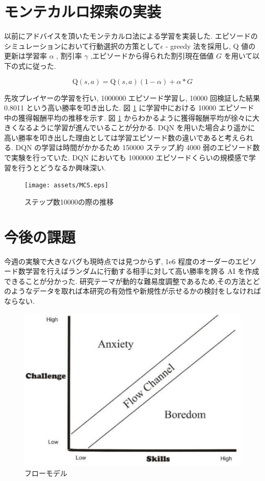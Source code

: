 \documentclass{jarticle}     %
\begin{document}
\section{モンテカルロ探索の実装}
以前にアドバイスを頂いたモンテカルロ法による学習を実装した\cite{緑本}.
エピソードのシミュレーションにおいて行動選択の方策として$\epsilon$ - greedy 法を採用し,
Q 値の更新は学習率 $\alpha$ , 割引率 $\gamma$ ,エピソードから得られた割引現在価値 $G$ を用いて以下の式に従った.

\begin{equation*}
  \mathrm{Q}(s,a) = \mathrm{Q}(s,a)(1 - \alpha) + \alpha * G 
\end{equation*}

先攻プレイヤーの学習を行い, 1000000 エピソード学習し, 10000 回検証した結果 0.8011 という高い勝率を叩き出した.
図 \ref{fig:MCS} に学習中における 10000 エピソード中の獲得報酬平均の推移を示す.
図 \ref{fig:MCS} からわかるように獲得報酬平均が徐々に大きくなるように学習が進んでいることが分かる.
DQN を用いた場合より遥かに高い勝率を叩き出した理由としては学習エピソード数の違いであると考えられる. DQN の学習は時間がかかるため 150000 ステップ,約 4000 弱のエピソード数で実験を行っていた. DQN においても 1000000 エピソードくらいの規模感で学習を行うとどうなるか興味深い.

\begin{figure}[htbp]
  \centering
  \texttt{[image: assets/MCS.eps]}
  \caption{ステップ数10000の際の推移}
  \label{fig:MCS}
\end{figure}

\section{今後の課題}
今週の実験で大きなバグも現時点では見つからず, 1e6 程度のオーダーのエピソード数学習を行えばランダムに行動する相手に対して高い勝率を誇る AI を作成できることが分かった.
研究テーマが動的な難易度調整であるため,その方法とどのようなデータを取れば本研究の有効性や新規性が示せるかの検討をしなければならない.

\begin{figure}[htbp]
  \centering
  \includegraphics[width=150mm]{assets/Flow.eps}
  \caption{フローモデル}
  \label{fig:flow}
\end{figure}
\end{document}
